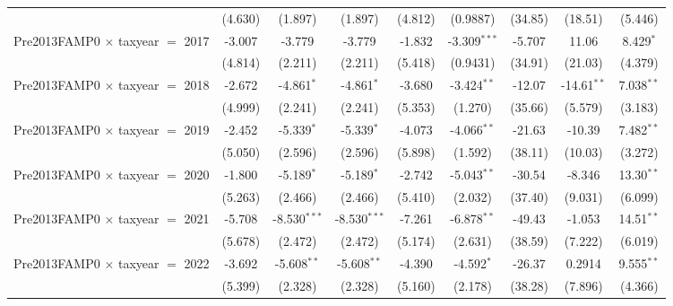 \begin{tabular}{lcccccccc}
                                           & (4.630)       & (1.897)        & (1.897)        & (4.812)       & (0.9887)       & (34.85)       & (18.51)       & (5.446)\\   
   Pre2013FAMP0 $\times$ taxyear $=$ 2017  & -3.007        & -3.779         & -3.779         & -1.832        & -3.309$^{***}$ & -5.707        & 11.06         & 8.429$^{*}$\\   
                                           & (4.814)       & (2.211)        & (2.211)        & (5.418)       & (0.9431)       & (34.91)       & (21.03)       & (4.379)\\   
   Pre2013FAMP0 $\times$ taxyear $=$ 2018  & -2.672        & -4.861$^{*}$   & -4.861$^{*}$   & -3.680        & -3.424$^{**}$  & -12.07        & -14.61$^{**}$ & 7.038$^{**}$\\   
                                           & (4.999)       & (2.241)        & (2.241)        & (5.353)       & (1.270)        & (35.66)       & (5.579)       & (3.183)\\   
   Pre2013FAMP0 $\times$ taxyear $=$ 2019  & -2.452        & -5.339$^{*}$   & -5.339$^{*}$   & -4.073        & -4.066$^{**}$  & -21.63        & -10.39        & 7.482$^{**}$\\   
                                           & (5.050)       & (2.596)        & (2.596)        & (5.898)       & (1.592)        & (38.11)       & (10.03)       & (3.272)\\   
   Pre2013FAMP0 $\times$ taxyear $=$ 2020  & -1.800        & -5.189$^{*}$   & -5.189$^{*}$   & -2.742        & -5.043$^{**}$  & -30.54        & -8.346        & 13.30$^{**}$\\   
                                           & (5.263)       & (2.466)        & (2.466)        & (5.410)       & (2.032)        & (37.40)       & (9.031)       & (6.099)\\   
   Pre2013FAMP0 $\times$ taxyear $=$ 2021  & -5.708        & -8.530$^{***}$ & -8.530$^{***}$ & -7.261        & -6.878$^{**}$  & -49.43        & -1.053        & 14.51$^{**}$\\   
                                           & (5.678)       & (2.472)        & (2.472)        & (5.174)       & (2.631)        & (38.59)       & (7.222)       & (6.019)\\   
   Pre2013FAMP0 $\times$ taxyear $=$ 2022  & -3.692        & -5.608$^{**}$  & -5.608$^{**}$  & -4.390        & -4.592$^{*}$   & -26.37        & 0.2914        & 9.555$^{**}$\\   
                                           & (5.399)       & (2.328)        & (2.328)        & (5.160)       & (2.178)        & (38.28)       & (7.896)       & (4.366)\\   

\end{tabular}
